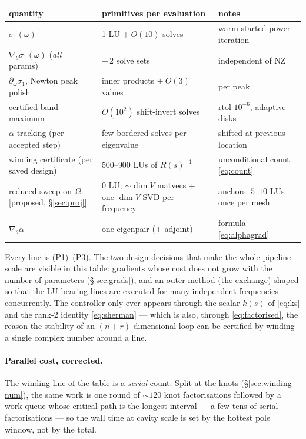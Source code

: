 \documentclass[11pt,a4paper]{article}
\newcommand{\revP}[1]{#1}
\begin{document}
{\begin{center}
\small
\begin{tabular}{lll}
\toprule
quantity & primitives per evaluation & notes\\
\midrule
$\sigma_1(\omega)$ & 1 LU $+\ O(10)$ solves & warm-started power iteration \\
$\nabla_\theta\sigma_1(\omega)$ (\emph{all} params) & $+\,2$ solve sets & independent of NZ \\
$\partial_\omega\sigma_1$, Newton peak polish & inner products $+\ O(3)$ values & per peak \\
certified band maximum & $O(10^2)$ shift-invert solves & rtol $10^{-6}$, adaptive disks \\
$\alpha$ tracking (per accepted step) & few bordered solves per eigenvalue & shifted at previous location \\
winding certificate (per saved design) & $500$--$900$ LUs of $R(s)^{-1}$ & unconditional count \eqref{eq:count} \\
\revP{reduced sweep on $\Omega$ [proposed, \S\ref{sec:proj}]} & \revP{$0$ LU; $\sim\dim V$ matvecs $+$ one $\dim V$ SVD per frequency} & \revP{anchors: $5$--$10$ LUs once per mesh} \\
$\nabla_\theta\alpha$ & one eigenpair ($+$ adjoint) & formula \eqref{eq:alphagrad} \\
\bottomrule
\end{tabular}
\end{center}

\noindent
Every line is (P1)--(P3).  The two design decisions that make the whole pipeline scale are
visible in this table: gradients whose cost does not grow with the number of parameters
(\S\ref{sec:grads}), and an outer method (the exchange) shaped so that the LU-bearing
lines are executed for many independent frequencies concurrently.  The controller only
ever appears through the scalar $k(s)$ of \eqref{eq:ks} and the rank-2 identity
\eqref{eq:sherman} --- which is also, through \eqref{eq:factorised}, the reason the
stability of an $(n{+}r)$-dimensional loop can be certified by winding a single complex
number around a line.

\paragraph{Parallel cost, corrected.}  The winding line of the table is a \emph{serial}
count.  Split at the knots (\S\ref{sec:winding-num}), the same work
is one round of $\sim120$ knot factorisations followed by a work queue whose critical
path is the longest interval --- a few tens of serial factorisations --- so the wall time
at cavity scale is set by the hottest pole window, not by the total.

}
\end{document}
